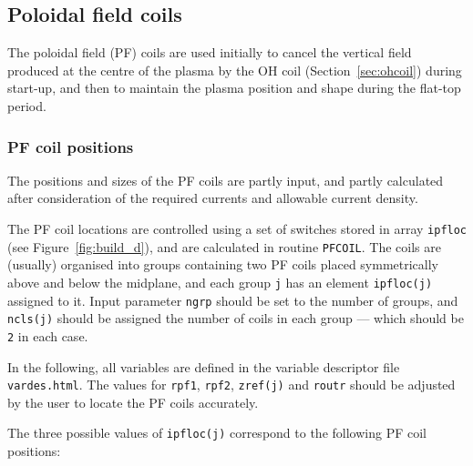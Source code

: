 \documentclass[11pt,a4paper]{report}
\begin{document}
\subsection{Poloidal field coils}
\label{sec:pfcoils}

The poloidal field (PF) coils are used initially to cancel the vertical field
produced at the centre of the plasma by the OH coil (Section~\ref{sec:ohcoil})
during start-up, and then to maintain the plasma position and shape during the
flat-top period.

\subsubsection{PF coil positions}

The positions and sizes of the PF coils are partly input, and partly
calculated after consideration of the required currents and allowable current
density.

The PF coil locations are controlled using a set of switches stored in array
\texttt{ipfloc} (see Figure~\ref{fig:build_d}), and are calculated in routine
\texttt{PFCOIL}. The coils are (usually) organised into groups containing two
PF coils placed symmetrically above and below the midplane, and each group
\texttt{j} has an element \texttt{ipfloc(j)} assigned to it. Input parameter
\texttt{ngrp} should be set to the number of groups, and \texttt{ncls(j)}
should be assigned the number of coils in each group --- which should be
\texttt{2} in each case.

In the following, all variables are defined in the variable descriptor file
\texttt{vardes.html}. The values for \texttt{rpf1}, \texttt{rpf2},
\texttt{zref(j)} and \texttt{routr} should be adjusted by the user to locate
the PF coils accurately.

The three possible values of \texttt{ipfloc(j)} correspond to the following PF
coil positions:
\end{document}
